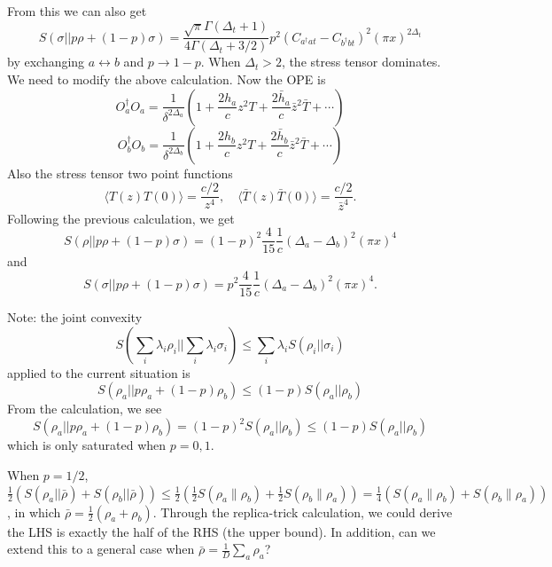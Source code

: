 \documentclass{article}
\theoremstyle{plain}
\theoremstyle{definition}
\theoremstyle{plain}
\def\la{\langle}
\def\ra{\rangle}
\begin{document}
From this we can also get
\begin{equation}
\boxed{S(\sigma||p\rho+(1-p)\sigma)=\frac{\sqrt{\pi}\Gamma(\Delta_t+1)}{4\Gamma(\Delta_t+3/2)}p^2 (C_{a^\dagger at}-C_{b^\dagger bt})^2 (\pi x)^{2\Delta_t}}
\end{equation}
by exchanging $a \leftrightarrow b$ and $p\to 1-p$.
When $\Delta_t>2$, the stress tensor dominates. We need to modify the above calculation. Now the OPE is
\begin{equation}
    O_a^\dagger O_a= \frac{1}{\delta^{2\Delta_a}} \left(1+  \frac{2h_a}{c} z^{2} T+\frac{2\bar h_a}{c} \bar z^{2} \bar T+\cdots\right)
\end{equation}
\begin{equation}
    O_b^\dagger O_b= \frac{1}{\delta^{2\Delta_b}} \left(1+  \frac{2h_b}{c} z^{2} T+\frac{2\bar h_b}{c} \bar z^{2} \bar T+\cdots\right)
\end{equation}
Also the stress tensor two point functions
\begin{equation}
    \la T(z)T(0) \ra = \frac{c/2}{z^4} ,\quad \la \bar T(z)\bar T(0) \ra = \frac{c/2}{\bar z^4}.
\end{equation}
Following the previous calculation, we get
\begin{equation}
   \boxed{ S(\rho||p\rho+(1-p)\sigma)=(1-p)^2\frac{4}{15}\frac{1}{c} (\Delta_a-\Delta_b)^2 (\pi x)^{4}}
\end{equation}
and
\begin{equation}
    \boxed{S(\sigma||p\rho+(1-p)\sigma)=p^2\frac{4}{15}\frac{1}{c} (\Delta_a-\Delta_b)^2 (\pi x)^{4}.}
\end{equation}

Note: the joint convexity 
\begin{equation}
    S(\sum_i \lambda_i \rho_i||\sum_i \lambda_i \sigma_i) \leq \sum_i \lambda_i S(\rho_i||\sigma_i)
\end{equation}
applied to the current situation is
\begin{equation}
    S(\rho_a||p\rho_a+(1-p)\rho_b) \leq (1-p) S(\rho_a||\rho_b)
\end{equation}
From the calculation, we see
\begin{equation}
    S(\rho_a||p\rho_a+(1-p)\rho_b)=(1-p)^2 S(\rho_a||\rho_b) \leq (1-p) S(\rho_a||\rho_b) 
\end{equation}
which is only saturated when $p=0,1$.

When $p=1/2$, $\frac{1}{2}(S(\rho_a||\bar{\rho})+S(\rho_b||\bar{\rho}))\leq \frac{1}{2}(\frac{1}{2}S(\rho_a\|\rho_b)+\frac{1}{2}S(\rho_b\|\rho_a))=\frac{1}{4}(S(\rho_a\|\rho_b)+S(\rho_b\|\rho_a))$, in which $\bar{\rho}=\frac{1}{2}(\rho_a+\rho_b)$. Through the replica-trick calculation, we could derive the LHS is exactly the half of the RHS (the upper bound). In addition, can we extend this to a general case when $\bar{\rho}=\frac{1}{D}\sum_a \rho_a$?
\end{document}
